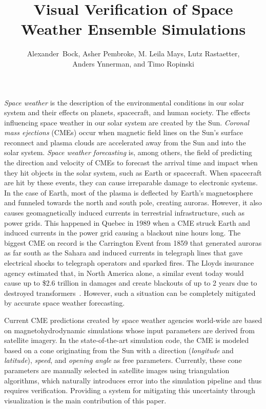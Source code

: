 \documentclass[journal]{vgtc}                %
\title{Visual Verification of Space Weather Ensemble Simulations}
\author{
    Alexander~Bock,
    Asher Pembroke,
    M. Leila Mays,
    Lutz Rastaetter,\\%
    Anders Ynnerman,
    and Timo Ropinski%
}
\begin{document}
\maketitle
\emph{Space weather} is the description of the environmental conditions in our solar system and their effects on planets, spacecraft, and human society. The effects influencing space weather in our solar system are created by the Sun. \emph{Coronal mass ejections} (CMEs) occur when magnetic field lines on the Sun's surface reconnect and plasma clouds are accelerated away from the Sun and into the solar system. \emph{Space weather forecasting} is, among others, the field of predicting the direction and velocity of CMEs to forecast the arrival time and impact when they hit objects in the solar system, such as Earth or spacecraft. When spacecraft are hit by these events, they can cause irreparable damage to electronic systems. In the case of Earth, most of the plasma is deflected by Earth's magnetosphere and funneled towards the north and south pole, creating auroras. However, it also causes geomagnetically induced currents in terrestrial infrastructure, such as power grids. This happened in Quebec in 1989 when a CME struck Earth and induced currents in the power grid causing a blackout nine hours long. The biggest CME on record is the Carrington Event from 1859 that generated auroras as far south as the Sahara and induced currents in telegraph lines that gave electrical shocks to telegraph operators and sparked fires. The Lloyds insurance agency estimated that, in North America alone, a similar event today would cause up to \$2.6 trillion in damages and create blackouts of up to 2 years due to destroyed transformers~\cite{lloyds2013impact}. However, such a situation can be completely mitigated by accurate space weather forecasting.

Current CME predictions created by space weather agencies world-wide are based on magnetohydrodynamic simulations whose input parameters are derived from satellite imagery. In the state-of-the-art simulation code, the CME is modeled based on a cone originating from the Sun with a direction (\emph{longitude} and \emph{latitude}), \emph{speed}, and \emph{opening angle} as free parameters. Currently, these cone parameters are manually selected in satellite images using triangulation algorithms, which naturally introduces error into the simulation pipeline and thus requires verification. Providing a system for mitigating this uncertainty through visualization is the main contribution of this paper.
\end{document}
